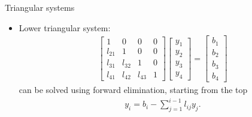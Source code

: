 \documentclass[11pt,xcolor={dvipsnames},aspectratio=159,hyperref={pdftex,pdfpagemode=UseNone,hidelinks,pdfdisplaydoctitle=true},usepdftitle=false]{beamer}
\begin{document}
\begin{frame}{Triangular systems}
    \begin{itemize}  
    \item Lower triangular system: 
        \begin{align*}
        \begin{bmatrix}
            1 & 0 & 0 & 0 \\
            l_{21} & 1 & 0 & 0 \\
            l_{31} & l_{32} & 1 & 0 \\
            l_{41} & l_{42} & l_{43} & 1
        \end{bmatrix}
        \begin{bmatrix}
            y_1 \\
            y_2 \\
            y_3 \\
            y_4
        \end{bmatrix}
        =
        \begin{bmatrix}
            b_1 \\
            b_2 \\
            b_3 \\
            b_4
        \end{bmatrix}
        \end{align*}
        can be solved using forward elimination, starting from the top
        \begin{align*}
            y_i = b_i - \sum_{j=1}^{i-1} l_{ij} y_j.
        \end{align*}
\end{itemize}
\end{frame}
\end{document}
